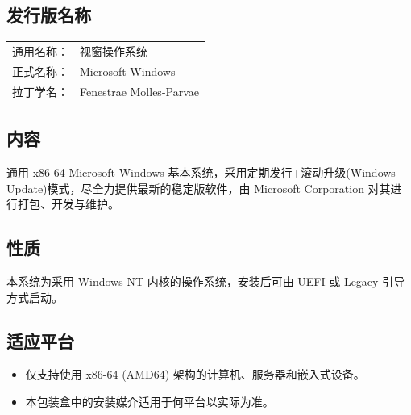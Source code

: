 \documentclass{article}
\begin{document}
\begin{multicols*}{3}
\begin{tcolorbox}
	\section*{发行版名称}
	\end{tcolorbox}
	\begin{tabularx}{\linewidth}{@{}ll@{}}
		通用名称： & 视窗操作系统 \\
		正式名称： & Microsoft Windows \\
		拉丁学名： & Fenestrae Molles-Parvae \\
	\end{tabularx}

	\medskip


	\begin{tcolorbox}
	\section*{内容}
	\end{tcolorbox}

	通用 x86-64 Microsoft Windows 基本系统，采用定期发行+滚动升级(Windows Update)模式，尽全力提供最新的稳定版软件，由 Microsoft Corporation 对其进行打包、开发与维护。



	\medskip


	\begin{tcolorbox}
	\section*{性质}
	\end{tcolorbox}

	本系统为采用 Windows NT 内核的操作系统，安装后可由 UEFI 或 Legacy 引导方式启动。

	\medskip


	\begin{tcolorbox}
	\section*{适应平台}
	\end{tcolorbox}

	\begin{itemize}
		\item 仅支持使用 x86-64 (AMD64) 架构的计算机、服务器和嵌入式设备。
		\item 本包装盒中的安装媒介适用于何平台以实际为准。
	\end{itemize}



\end{multicols*}
\end{document}
